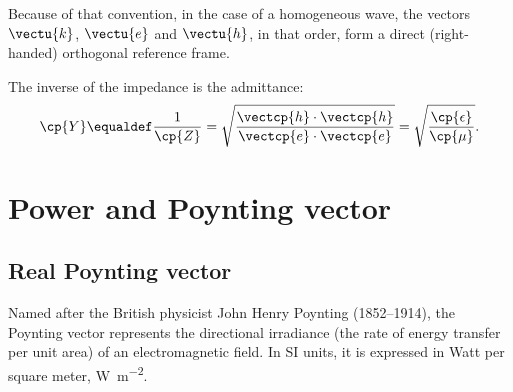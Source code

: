 \begin{refsection}
Because of that convention, in the case of a homogeneous wave,
the vectors $\vectu{k}$, $\vectu{e}$ and $\vectu{h}$, in that order, form a direct (right-handed) orthogonal reference frame.

The inverse of the impedance is the admittance:
\begin{equation}
    \cp{Y}
    \equaldef
    \frac{1}{\cp{Z}}
    =
    \sqrt{\frac{\vectcp{h} \cdot \vectcp{h}}{\vectcp{e} \cdot \vectcp{e}}}
    =
    \sqrt{\frac{\cp{\epsilon}}{\cp{\mu}}}
    \text{.}
\end{equation}






\FloatBarrier
\section{Power and Poynting vector}
\label{sec:power_and_poynting_vector}

\subsection{Real Poynting vector}
Named after the British physicist John Henry Poynting (1852--1914),
the Poynting vector represents the directional irradiance (the rate of energy transfer per unit area) of an electromagnetic field.
In SI units, it is expressed in Watt per square meter, \si{\watt\per\meter\squared}.


\end{refsection}
